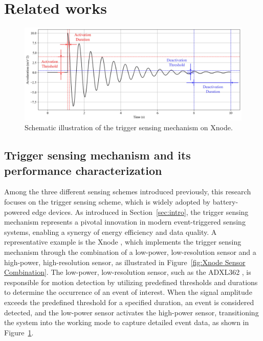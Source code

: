 \documentclass[a4paper,fleqn,numbers,sort&compress]{cas-sc}
\begin{document}
\section{Related works}
\label{sec:related_works}

\begin{figure}[htbp]
    \centering
    \includegraphics[width=0.85\linewidth]{Fig3.jpg}
    \caption{Schematic illustration of the trigger sensing mechanism on Xnode.}
    \label{fig:Xnode Trigger Sensing Mechanism}
\end{figure}

\subsection{Trigger sensing mechanism and its performance characterization}

Among the three different sensing schemes introduced previously, this research focuses on the trigger sensing scheme, which is widely adopted by battery-powered edge devices. As introduced in Section~\ref{sec:intro}, the trigger sensing mechanism represents a pivotal innovation in modern event-triggered sensing systems, enabling a synergy of energy efficiency and data quality. A representative example is the Xnode \citep{fu_suddenevent_2019}, which implements the trigger sensing mechanism through the combination of a low-power, low-resolution sensor and a high-power, high-resolution sensor, as illustrated in Figure~\ref{fig:Xnode Sensor Combination}. The low-power, low-resolution sensor, such as the ADXL362 \citep{analogdevices_adxl362_2024}, is responsible for motion detection by utilizing predefined thresholds and durations to determine the occurrence of an event of interest. When the signal amplitude exceeds the predefined threshold for a specified duration, an event is considered detected, and the low-power sensor activates the high-power sensor, transitioning the system into the working mode to capture detailed event data, as shown in Figure~\ref{fig:Xnode Trigger Sensing Mechanism}.
\end{document}
